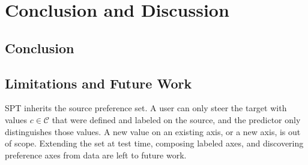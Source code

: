 \documentclass{article}
\begin{document}
\section{Conclusion and Discussion}
\label{sec:conclusion_discussion}

\subsection{Conclusion}
\label{sec:conclusion}

\subsection{Limitations and Future Work}
\label{sec:limitations}

SPT inherits the source preference set. A user can only steer the target with
values $c\in\mathcal{C}$ that were defined and labeled on the source, and the
predictor only distinguishes those values. A new value on an existing axis, or a
new axis, is out of scope. Extending the set at test time, composing labeled
axes, and discovering preference axes from data are left to future work.










\end{document}

